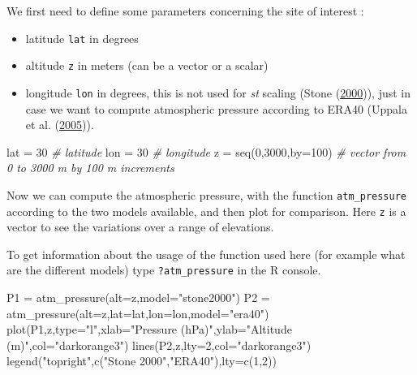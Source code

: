 \documentclass[
]{book}
\newenvironment{Shaded}{\begin{snugshade}}{\end{snugshade}}
\newcommand{\AttributeTok}[1]{\textcolor[rgb]{0.77,0.63,0.00}{#1}}
\newcommand{\CommentTok}[1]{\textcolor[rgb]{0.56,0.35,0.01}{\textit{#1}}}
\newcommand{\DecValTok}[1]{\textcolor[rgb]{0.00,0.00,0.81}{#1}}
\newcommand{\FunctionTok}[1]{\textcolor[rgb]{0.00,0.00,0.00}{#1}}
\newcommand{\NormalTok}[1]{#1}
\newcommand{\OtherTok}[1]{\textcolor[rgb]{0.56,0.35,0.01}{#1}}
\newcommand{\StringTok}[1]{\textcolor[rgb]{0.31,0.60,0.02}{#1}}
\providecommand{\tightlist}{%
  \setlength{\itemsep}{0pt}\setlength{\parskip}{0pt}}
\begin{document}
We first need to define some parameters concerning the site of interest :

\begin{itemize}
\tightlist
\item
  latitude \texttt{lat} in degrees
\item
  altitude \texttt{z} in meters (can be a vector or a scalar)
\item
  longitude \texttt{lon} in degrees, this is not used for \emph{st} scaling (Stone (\protect\hyperlink{ref-stone2000air}{2000})), just in case we want to compute atmospheric pressure according to ERA40 (Uppala et al. (\protect\hyperlink{ref-uppala2005era40}{2005})).
\end{itemize}

\begin{Shaded}
\begin{Highlighting}[]
\NormalTok{lat }\OtherTok{=} \DecValTok{30} \CommentTok{\# latitude}
\NormalTok{lon }\OtherTok{=} \DecValTok{30} \CommentTok{\# longitude}
\NormalTok{z }\OtherTok{=} \FunctionTok{seq}\NormalTok{(}\DecValTok{0}\NormalTok{,}\DecValTok{3000}\NormalTok{,}\AttributeTok{by=}\DecValTok{100}\NormalTok{) }\CommentTok{\# vector from 0 to 3000 m by 100 m increments}
\end{Highlighting}
\end{Shaded}

Now we can compute the atmospheric pressure, with the function \texttt{atm\_pressure} according to the two models available, and then plot for comparison.
Here \texttt{z} is a vector to see the variations over a range of elevations.

To get information about the usage of the function used here (for example what are the different models) type \texttt{?atm\_pressure} in the R console.

\begin{Shaded}
\begin{Highlighting}[]
\NormalTok{P1 }\OtherTok{=} \FunctionTok{atm\_pressure}\NormalTok{(}\AttributeTok{alt=}\NormalTok{z,}\AttributeTok{model=}\StringTok{"stone2000"}\NormalTok{) }
\NormalTok{P2 }\OtherTok{=} \FunctionTok{atm\_pressure}\NormalTok{(}\AttributeTok{alt=}\NormalTok{z,}\AttributeTok{lat=}\NormalTok{lat,}\AttributeTok{lon=}\NormalTok{lon,}\AttributeTok{model=}\StringTok{"era40"}\NormalTok{)}
\FunctionTok{plot}\NormalTok{(P1,z,}\AttributeTok{type=}\StringTok{"l"}\NormalTok{,}\AttributeTok{xlab=}\StringTok{"Pressure (hPa)"}\NormalTok{,}\AttributeTok{ylab=}\StringTok{"Altitude (m)"}\NormalTok{,}\AttributeTok{col=}\StringTok{"darkorange3"}\NormalTok{) }
\FunctionTok{lines}\NormalTok{(P2,z,}\AttributeTok{lty=}\DecValTok{2}\NormalTok{,}\AttributeTok{col=}\StringTok{"darkorange3"}\NormalTok{)}
\FunctionTok{legend}\NormalTok{(}\StringTok{"topright"}\NormalTok{,}\FunctionTok{c}\NormalTok{(}\StringTok{"Stone 2000"}\NormalTok{,}\StringTok{"ERA40"}\NormalTok{),}\AttributeTok{lty=}\FunctionTok{c}\NormalTok{(}\DecValTok{1}\NormalTok{,}\DecValTok{2}\NormalTok{))}
\end{Highlighting}
\end{Shaded}
\end{document}
